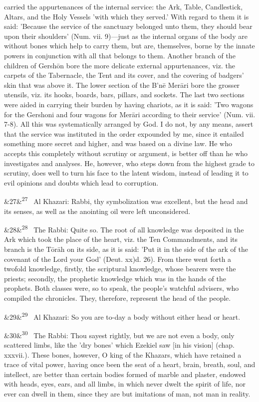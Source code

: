 \documentclass[12pt]{article}
\newcommand{\para}[1][]{\par\noindent\ifx&#1&\else\textsuperscript{\footnotesize #1}~\fi}
\begin{document}
carried the appurtenances of the internal service: the Ark, Table, Candlestick, Altars, and the Holy Vessels 'with which they served.' With regard to them it is said: 'Because the service of the sanctuary belonged unto them, they should bear upon their shoulders' (Num. vii. 9)---just as the internal organs of the body are without bones which help to carry them, but are, themselves, borne by the innate powers in conjunction with all that belongs to them. Another branch of the children of Gershōn bore the more delicate external appurtenances, viz. the carpets of the Tabernacle, the Tent and its cover, and the covering of badgers’ skin that was above it. The lower section of the B’nē Merāri bore the grosser utensils, viz. its hooks, boards, bars, pillars, and sockets. The last two sections were aided in carrying their burden by having chariots, as it is said: 'Two wagons for the Gershoni and four wagons for Merāri according to their service' (Num. vii. 7-8). All this was systematically arranged by God. I do not, by any means, assert that the service was instituted in the order expounded by me, since it entailed something more secret and higher, and was based on a divine law. He who accepts this completely without scrutiny or argument, is better off than he who investigates and analyses. He, however, who steps down from the highest grade to scrutiny, does well to turn his face to the latent wisdom, instead of leading it to evil opinions and doubts which lead to corruption.

\para[27] Al Khazari: Rabbi, thy symbolization was excellent, but the head and its senses, as well as the anointing oil were left unconsidered.

\para[28] The Rabbi: Quite so. The root of all knowledge was deposited in the Ark which took the place of the heart, viz. the Ten Commandments, and its branch is the Tōrāh on its side, as it is said: 'Put it in the side of the ark of the covenant of the Lord your God' (Deut. xx)d. 26). From there went forth a twofold knowledge, firstly, the scriptural knowledge, whose bearers were the priests; secondly, the prophetic knowledge which was in the hands of the prophets. Both classes were, so to speak, the people's watchful advisers, who compiled the chronicles. They, therefore, represent the head of the people.

\para[29] Al Khazari: So you are to-day a body without either head or heart.

\para[30] The Rabbi: Thou sayest rightly, but we are not even a body, only scattered limbs, like the 'dry bones' which Ezekiel saw [in his vision] (chap. xxxvii.). These bones, however, O king of the Khazars, which have retained a trace of vital power, having once been the seat of a heart, brain, breath, soul, and intellect, are better than certain bodies formed of marble and plaster, endowed with heads, eyes, ears, and all limbs, in which never dwelt the spirit of life, nor ever can dwell in them, since they are but imitations of man, not man in reality.
\end{document}
